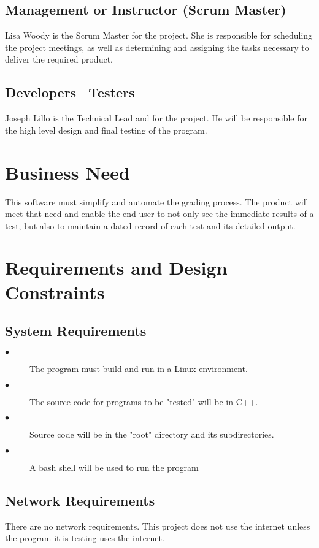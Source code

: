 \subsection{Management or Instructor (Scrum Master)}
Lisa Woody is the Scrum Master for the project.  She is responsible for scheduling the project meetings, as well as 
determining and assigning the tasks necessary to deliver the required product.

\subsection{Developers --Testers}
Joseph Lillo is the Technical Lead and for the project.  He will be responsible for the high level design and final
testing of the program.

\section{Business Need}
This software must simplify and automate the grading process.  The product will meet that need and enable 
the end user to not only see the immediate results of a test, but also to maintain a dated record of each test
and its detailed output.

\section{Requirements and Design Constraints}

\subsection{System  Requirements}
\begin{description}
\item [$\bullet$] The program must build and run in a Linux environment.
\item [$\bullet$] The source code for programs to be "tested" will be in C++.
\item [$\bullet$] Source code will be in the "root" directory and its subdirectories.
\item [$\bullet$] A bash shell will be used to run the program
\end{description}

\subsection{Network Requirements}
There are no network requirements. This project does not use the internet unless the program it is 
testing uses the internet.


